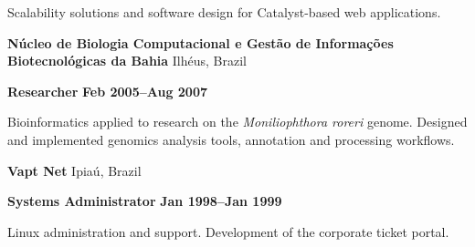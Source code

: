 \documentclass[a4paper,oneside]{memoir}
\begin{document}
\begin{multicols}{2}
\begin{flushleft}
\scriptsize

Scalability solutions and software design for Catalyst-based web applications.

\normalsize

\textbf{\color{RoyalBlue}Núcleo de Biologia Computacional e Gestão de Informações Biotecnológicas da Bahia} \footnotesize Ilhéus, Brazil\normalsize

\textbf{Researcher}
\footnotesize\textbf{Feb 2005--Aug 2007}\normalsize

\scriptsize

Bioinformatics applied to research on the \emph{Moniliophthora roreri} genome.
Designed and implemented genomics analysis tools, annotation and processing
workflows.

\normalsize

\textbf{\color{RoyalBlue}Vapt Net} \footnotesize Ipiaú, Brazil\normalsize

\textbf{Systems Administrator}
\footnotesize\textbf{Jan 1998--Jan 1999}\normalsize

\scriptsize

Linux administration and support. Development of the corporate ticket portal.

\end{flushleft}

\end{multicols}
\end{document}
